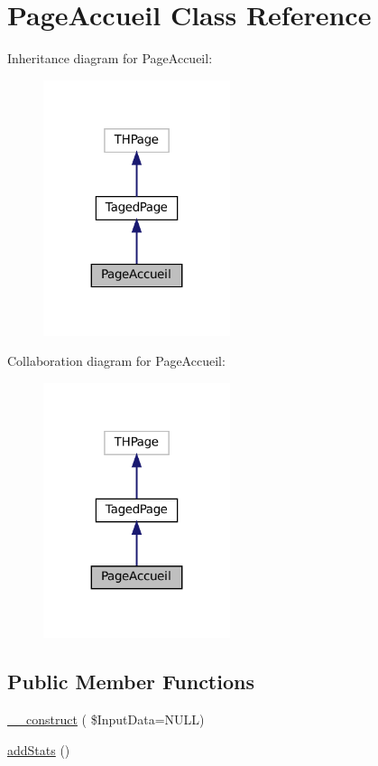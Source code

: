 \hypertarget{class_page_accueil}{}\section{Page\+Accueil Class Reference}
\label{class_page_accueil}


Inheritance diagram for Page\+Accueil\+:\nopagebreak
\begin{figure}[H]
\begin{center}
\leavevmode
\includegraphics[width=155pt]{class_page_accueil__inherit__graph}
\end{center}
\end{figure}


Collaboration diagram for Page\+Accueil\+:\nopagebreak
\begin{figure}[H]
\begin{center}
\leavevmode
\includegraphics[width=155pt]{class_page_accueil__coll__graph}
\end{center}
\end{figure}
\subsection*{Public Member Functions}
\begin{DoxyCompactItemize}
\item 
\hyperlink{class_page_accueil_a94778509e719e4a7620440be3b76f986}{\+\_\+\+\_\+construct} ( \$Input\+Data=N\+U\+LL)
\item 
\hyperlink{class_page_accueil_a92f6557a9cfaf1e0f49d7461d7fac2c4}{add\+Stats} ()
\end{DoxyCompactItemize}
